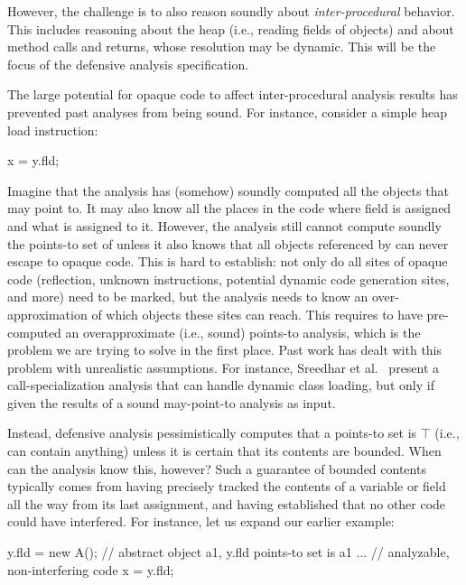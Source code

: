 However, the challenge is to also reason soundly about \emph{inter-procedural} behavior. This includes reasoning about the heap (i.e., reading fields of objects) and about method calls and returns, whose resolution may be dynamic. This will be the focus of the defensive analysis specification.


The large potential for opaque code to affect inter-procedural analysis results has prevented past analyses from being sound. For instance, consider a simple heap load instruction:

\begin{javaBox}
x = y.fld;
\end{javaBox}

Imagine that the analysis has (somehow) soundly computed all the objects that  may point to. It may also know all the places in the code where field  is assigned and what is assigned to it. However, the analysis still cannot compute soundly the points-to set of  unless it also knows that all objects referenced by  can never escape to opaque code. This is hard to establish: not only do all sites of opaque code (reflection, unknown instructions, potential dynamic code generation sites, and more) need to be marked, but the analysis needs to know an over-approximation of which objects these sites can reach. This requires to have pre-computed an overapproximate (i.e., sound) points-to analysis, which is the problem we are trying to solve in the first place. Past work has dealt with this problem with unrealistic assumptions. For instance, Sreedhar et al.~\cite{pldi:2000:Sreedhar} present a call-specialization analysis that can handle dynamic class loading, but only if given the results of a sound may-point-to analysis as input.

Instead, defensive analysis pessimistically computes that a points-to set is $\top$ (i.e., can contain anything) unless it is certain that its contents are bounded. When can the analysis know this, however? Such a guarantee of bounded contents typically comes from having precisely tracked the contents of a variable or field all the way from its last assignment, and having established that no other code could have interfered. For instance, let us expand our earlier example:

\begin{javaBox}
y.fld = new A(); // abstract object a1, y.fld points-to set is {a1}
...              // analyzable, non-interfering code
x = y.fld;
\end{javaBox}


